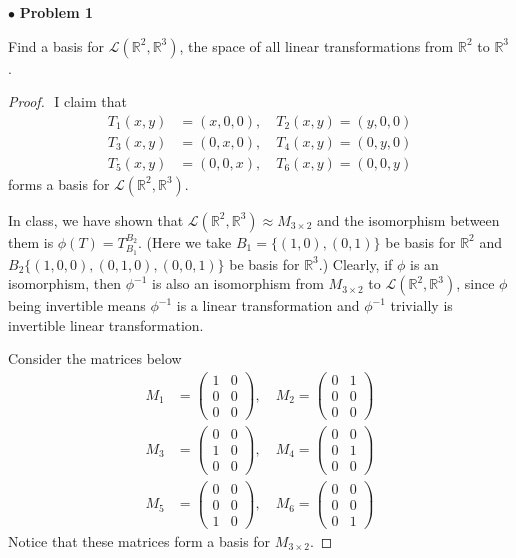 \documentclass{article}
\begin{document}
$ \bullet$ \textbf{Problem 1}
\medskip

\begin{itshape}
Find a basis for $\mathcal{L}(\mathbb{R}^2, \mathbb{R}^3)$, the space of all linear transformations from $\mathbb{R}^2$ to $\mathbb{R}^3$.
\end{itshape}
\medskip

\begin{proof}
$ $\newline
I claim that 
\begin{align*}
T_1(x,y) &= (x,0,0), \quad T_2(x,y) = (y,0,0) \\
T_3(x,y) &= (0,x,0), \quad T_4(x,y) = (0,y,0)\\
T_5(x,y) &= (0,0,x),  \quad T_6(x,y) = (0,0,y) 
\end{align*}
forms a basis for $\mathcal{L}(\mathbb{R}^2, \mathbb{R}^3)$.

In class, we have shown that $\mathcal{L}(\mathbb{R}^2, \mathbb{R}^3) \approx M_{3 \times 2}$ and the isomorphism between them is $\phi (T) = T_{B_1}^{B_2} $. (Here we take $B_1 = \{ (1,0), (0,1) \}$ be basis for $\mathbb{R}^2$ and $B_2 \{ (1,0,0), (0,1,0), (0,0,1) \}$ be basis for $\mathbb{R}^3$.) Clearly, if $\phi$ is an isomorphism, then $\phi ^{-1}$ is also an isomorphism from $M_{3 \times 2}$ to $\mathcal{L}(\mathbb{R}^2, \mathbb{R}^3)$, since $\phi$ being invertible means $\phi^{-1}$ is a linear transformation and $\phi^{-1}$ trivially is invertible linear transformation.

Consider the matrices below
\begin{align*}
M_1 &= \begin{pmatrix} 1 & 0 \\ 0&0 \\0&0 \end{pmatrix}, \quad M_2 = \begin{pmatrix} 0 & 1 \\ 0&0 \\0&0 \end{pmatrix} \\
M_3 &= \begin{pmatrix} 0 & 0 \\ 1&0 \\0&0 \end{pmatrix}, \quad M_4 = \begin{pmatrix} 0 & 0 \\ 0&1 \\0&0 \end{pmatrix} \\
M_5 &= \begin{pmatrix} 0 & 0 \\ 0&0 \\1&0 \end{pmatrix}, \quad M_6 = \begin{pmatrix} 0 & 0 \\ 0&0 \\0&1 \end{pmatrix}
\end{align*}
Notice that these matrices form a basis for $M_{3 \times 2}$.


\end{proof}
\end{document}
